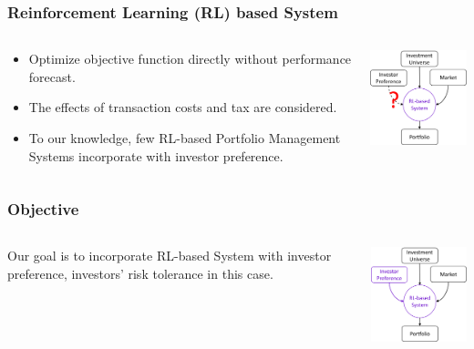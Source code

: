 \begin{frame}
\frametitle{Reinforcement Learning (RL) based System}
\begin{columns}
\begin{column}{0.55\textwidth}
\begin{itemize}
\item
Optimize objective function directly without performance forecast.
\item
The effects of transaction costs and tax are considered.
\item
\alert
{To our knowledge, few RL-based Portfolio Management Systems incorporate with investor preference.}
\end{itemize}
\end{column}
\begin{column}{0.45\textwidth}
\begin{center}
\includegraphics[width=4.8cm]{images/rl.png}
\end{center}
\end{column}
\end{columns}
\end{frame}






\begin{frame}
\frametitle{Objective}
\begin{columns}
\begin{column}{0.55\textwidth}
Our goal is to incorporate RL-based System with investor preference, \alert{investors' risk tolerance} in this case.

\end{column}
\begin{column}{0.45\textwidth}
\begin{center}
\includegraphics[width=4.8cm]{images/rl2.png}
\end{center}
\end{column}
\end{columns}
\end{frame}